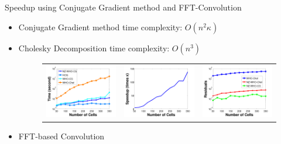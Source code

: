 \documentclass[serif,mathserif,final]{beamer}
\newcommand{\1}{\mathbb{I}} %
\begin{document}
\begin{frame}{}
\begin{columns}[t]
\begin{column}{0.24\linewidth}
      \begin{block}{Speedup using Conjugate Gradient method and FFT-Convolution}
        \begin{itemize}
          \item Conjugate Gradient method time complexity: $O(n^2\kappa)$
          \item Cholesky Decomposition time complexity: $O(n^3)$

          \begin{figure}[t]
            \begin{center}
            \begin{tabular}{ccc}
              \includegraphics[width=0.3\linewidth]{whotime} &
              \includegraphics[width=0.3\linewidth]{speedup} &
              \includegraphics[width=0.3\linewidth]{residual} \\
           \end{tabular}
            \end{center}
          \end{figure}
          \item FFT-based Convolution
        \end{itemize}
      \end{block}



\end{column}
\end{columns}
\end{frame}
\end{document}
